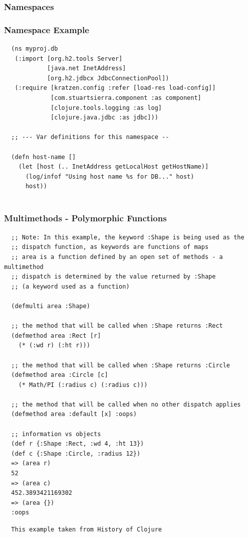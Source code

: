 \documentclass{beamer}
\renewcommand{\footnotesize}{\tiny}
\begin{document}
\begin{frame}
  \frametitle{Namespaces}
\end{frame}

\begin{frame}[fragile]
  \frametitle{Namespace Example}
  \begin{verbatim}
  (ns myproj.db
   (:import [org.h2.tools Server]
            [java.net InetAddress]
            [org.h2.jdbcx JdbcConnectionPool])
   (:require [kratzen.config :refer [load-res load-config]]
             [com.stuartsierra.component :as component]
             [clojure.tools.logging :as log]
             [clojure.java.jdbc :as jdbc])) 
  
  ;; --- Var definitions for this namespace --

  (defn host-name []
    (let [host (.. InetAddress getLocalHost getHostName)]
      (log/infof "Using host name %s for DB..." host)
      host))
  

  \end{verbatim}
\end{frame}



\begin{frame}[fragile]
  \frametitle{Multimethods - Polymorphic Functions}
  \begin{verbatim}
  ;; Note: In this example, the keyword :Shape is being used as the
  ;; dispatch function, as keywords are functions of maps
  ;; area is a function defined by an open set of methods - a multimethod
  ;; dispatch is determined by the value returned by :Shape 
  ;; (a keyword used as a function)

  (defmulti area :Shape)

  ;; the method that will be called when :Shape returns :Rect
  (defmethod area :Rect [r]
    (* (:wd r) (:ht r)))
  
  ;; the method that will be called when :Shape returns :Circle
  (defmethod area :Circle [c]
    (* Math/PI (:radius c) (:radius c)))
  
  ;; the method that will be called when no other dispatch applies
  (defmethod area :default [x] :oops)
  
  ;; information vs objects
  (def r {:Shape :Rect, :wd 4, :ht 13})
  (def c {:Shape :Circle, :radius 12})
  => (area r)
  52
  => (area c)
  452.3893421169302
  => (area {})
  :oops
  \end{verbatim}
  \Tiny\begin{verbatim}
  This example taken from History of Clojure  
  \end{verbatim}
\normalsize
  
\end{frame}
\end{document}
